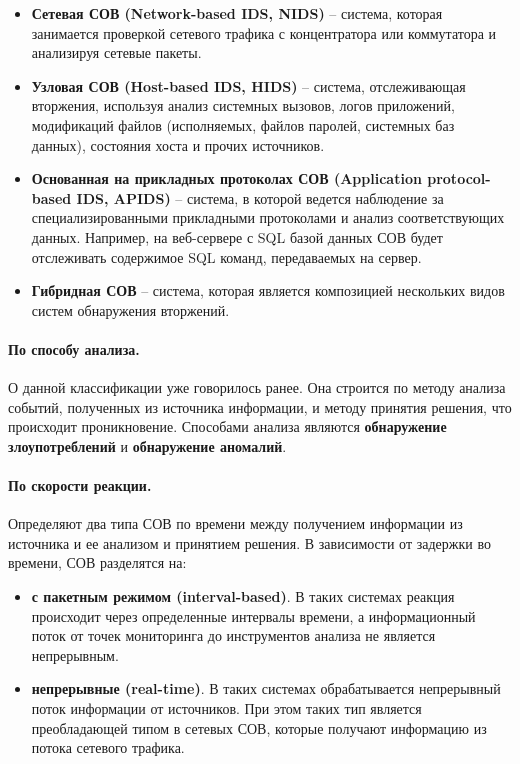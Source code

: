 \begin{itemize}
	\item \textbf{Сетевая СОВ (Network-based IDS, NIDS)} -- система, 
	которая занимается проверкой сетевого трафика с концентратора или коммутатора и анализируя сетевые пакеты.
	\item \textbf{Узловая СОВ (Host-based IDS, HIDS)} -- система, 
	отслеживающая вторжения, используя анализ системных вызовов, логов приложений, модификаций файлов 
	(исполняемых, файлов паролей, системных баз данных), состояния хоста и прочих источников. 
	\item \textbf{Основанная на прикладных протоколах СОВ (Application protocol-based IDS, APIDS)} -- система, 
	в которой ведется наблюдение за специализированными прикладными протоколами и анализ соответствующих 
	данных. Например, на веб-сервере с SQL базой данных СОВ будет отслеживать содержимое SQL команд, 
	передаваемых на сервер.
	\item \textbf{Гибридная СОВ} -- система, которая является композицией нескольких видов 
	систем обнаружения вторжений.
\end{itemize}

\paragraph*{По способу анализа.}

О данной классификации уже говорилось ранее. Она строится по методу анализа событий, полученных из источника 
информации, и методу принятия решения, что происходит проникновение. Способами анализа являются 
\textbf{обнаружение злоупотреблений} и \textbf{обнаружение аномалий}.

\paragraph*{По скорости реакции.}

Определяют два типа СОВ по времени между получением информации из источника и ее анализом и принятием решения.
В зависимости от задержки во времени, СОВ разделятся на:
\begin{itemize}
	\item \textbf{с пакетным режимом (interval-based)}. В таких системах реакция происходит 
	через определенные интервалы времени, а информационный поток от точек мониторинга до инструментов анализа
	не является непрерывным.
	\item \textbf{непрерывные (real-time)}. В таких системах обрабатывается непрерывный поток информации 
	от источников. При этом таких тип является преобладающей типом в сетевых СОВ, которые получают 
	информацию из потока сетевого трафика.
\end{itemize}


